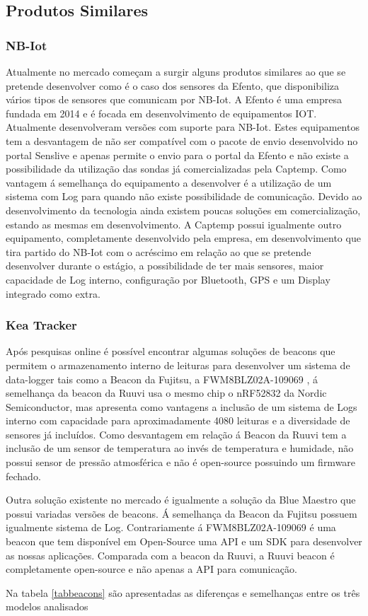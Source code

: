 \subsection{Produtos Similares}
\subsubsection{NB-Iot}
\par
Atualmente no mercado começam a surgir alguns produtos similares ao que se pretende desenvolver como é o caso dos sensores da Efento\cite{epoka}, que disponibiliza vários tipos de sensores que comunicam por NB-Iot. A Efento é uma empresa fundada em 2014 e é focada em desenvolvimento de equipamentos IOT. Atualmente desenvolveram versões com suporte para NB-Iot. Estes equipamentos tem a desvantagem de não ser compatível com o pacote de envio desenvolvido no portal Senslive e apenas permite o envio para o portal da Efento e não existe a possibilidade da utilização das sondas já comercializadas pela Captemp. Como vantagem á semelhança do equipamento a desenvolver é a utilização de um sistema com Log para quando não existe possibilidade de comunicação.
Devido ao desenvolvimento da tecnologia ainda existem poucas soluções em comercialização, estando as mesmas em desenvolvimento. A Captemp possui igualmente outro equipamento, completamente desenvolvido pela empresa, em desenvolvimento que tira partido do NB-Iot com o acréscimo em relação ao que se pretende desenvolver durante o estágio, a possibilidade de ter mais sensores, maior capacidade de Log interno, configuração por Bluetooth, GPS e um Display integrado como extra.
\subsubsection{Kea Tracker}
Após pesquisas online é possível encontrar algumas soluções de beacons que permitem o armazenamento interno de leituras para desenvolver um sistema de data-logger tais como a Beacon da Fujitsu, a FWM8BLZ02A-109069\cite{beacon1} , á semelhança da beacon da Ruuvi usa o mesmo chip o nRF52832 da Nordic Semiconductor, mas apresenta como vantagens a inclusão de um sistema de Logs interno com capacidade para aproximadamente 4080 leituras e a diversidade de sensores já incluídos. Como desvantagem em relação á Beacon da Ruuvi tem a inclusão de um sensor de temperatura ao invés de temperatura e humidade, não possui sensor de pressão atmosférica e não é open-source possuindo um firmware fechado.
\par
Outra solução existente no mercado é igualmente a solução da Blue Maestro que possui variadas versões de beacons. Á semelhança da Beacon da Fujitsu possuem igualmente sistema de Log. Contrariamente á FWM8BLZ02A-109069 é uma beacon que tem disponível em Open-Source uma API e um SDK para desenvolver as nossas aplicações. Comparada com a beacon da Ruuvi, a Ruuvi beacon é completamente open-source e não apenas a API para comunicação.
\par
Na tabela \ref{tabbeacons} são apresentadas as diferenças e semelhanças entre os três modelos analisados

